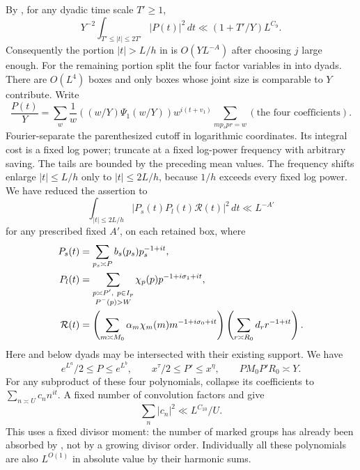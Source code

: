 By , for any dyadic time scale $T'\geq1$,
\[
 Y^{-2}\int_{T'\leq|t|\leq2T'}|P(t)|^2\,dt
          \ll (1+T'/Y)L^{C_9}.
\]
Consequently the portion $|t|>L/h$ in
 is $O(YL^{-A})$ after choosing $j$
large enough. For the remaining portion split the four factor
variables in  into dyads. There are
$O(L^4)$ boxes and only boxes whose joint size is comparable to $Y$
contribute. Write
\[
 \frac{P(t)}Y=\sum_w\frac{1}{w}
       \left((w/Y)\Psi_1(w/Y)\right)w^{i(t+v_1)}
       \sum_{mp_sp r=w}(\text{the four coefficients}).
\]
Fourier-separate the parenthesized cutoff in logarithmic coordinates.
Its integral cost is a fixed log power; truncate at a fixed
log-power frequency with arbitrary saving. The tails are bounded
by the preceding mean values. The frequency shifts enlarge
$|t|\leq L/h$ only to $|t|\leq2L/h$, because $1/h$ exceeds every
fixed log power. We have reduced the assertion to
\begin{equation}\label{eq:polynomial-target}
 \int_{|t|\leq2L/h}|P_s(t)P_l(t)\mathcal R(t)|^2\,dt
                                      \ll L^{-A'}
\end{equation}
for any prescribed fixed $A'$, on each retained box, where
\begin{align*}
 P_s(t)&=\sum_{p_s\asymp P}b_s(p_s)p_s^{-1+it},\\
 P_l(t)&=\sum_{\substack{p\asymp P',\ p\in I_p\\P^{-}(p)>W}}
                       \chi_p(p)p^{-1+i\sigma_1+it},\\
 \mathcal R(t)&=
     \left(\sum_{m\asymp M_0}\alpha_m\chi_m(m)m^{-1+i\sigma_0+it}\right)
     \left(\sum_{r\asymp R_0}d_rr^{-1+it}\right).
\end{align*}
Here and below dyads may be intersected with their existing support.
We have
\begin{equation}\label{eq:four-factor-scales}
 e^{L^a}/2\leq P\leq e^{L^b},\qquad
 x^\tau/2\leq P'\leq x^\eta,\qquad
 PM_0P'R_0\asymp Y.
\end{equation}
For any subproduct of these four polynomials, collapse its coefficients
to $\sum_{n\asymp U}c_nn^{it}$. A fixed number of convolution factors
and  give
\begin{equation}\label{eq:collapsed-polynomial-l2}
       \sum_n|c_n|^2\ll L^{C_{10}}/U.
\end{equation}
This uses a fixed divisor moment: the number of marked groups has
already been absorbed by , not by a growing divisor
order. Individually all these polynomials are also $L^{O(1)}$ in
absolute value by their harmonic sums.

